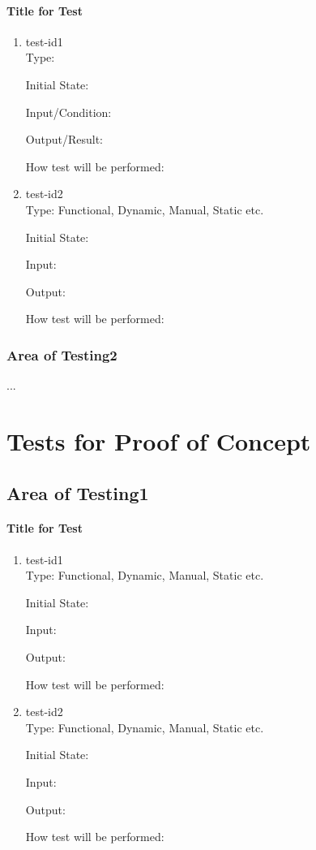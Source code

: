 \documentclass[12pt, titlepage]{article}
\begin{document}
	\paragraph{Title for Test}
	\begin{enumerate}
		\item{test-id1\\}
		Type: 
		
		Initial State: 
		
		Input/Condition: 
		
		Output/Result: 
		
		How test will be performed: 
		
		\item{test-id2\\}
		Type: Functional, Dynamic, Manual, Static etc.
		
		Initial State: 
		
		Input: 
		
		Output: 
		
		How test will be performed: 
	\end{enumerate}
	\subsubsection{Area of Testing2}
	...
	\section{Tests for Proof of Concept}
	\subsection{Area of Testing1}
	
	\paragraph{Title for Test}
	\begin{enumerate}
		\item{test-id1\\}
		Type: Functional, Dynamic, Manual, Static etc.
		
		Initial State: 
		
		Input: 
		
		Output: 
		
		How test will be performed: 
		
		\item{test-id2\\}
		Type: Functional, Dynamic, Manual, Static etc.
		
		Initial State: 
		
		Input: 
		
		Output: 
		
		How test will be performed: 
	\end{enumerate}
\end{document}
